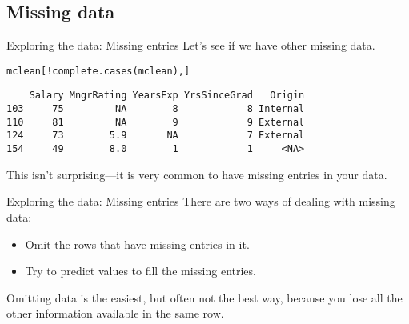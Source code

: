 \documentclass{beamer}\usepackage[]{graphicx}\usepackage[]{color}
\makeatletter
\newcommand{\hlopt}[1]{\textcolor[rgb]{1,0.894,0.769}{#1}}%
\newcommand{\hlstd}[1]{\textcolor[rgb]{1,0.894,0.769}{#1}}%
\newcommand{\hlkwb}[1]{\textcolor[rgb]{0.804,0.776,0.451}{#1}}%
\newcommand{\hlkwc}[1]{\textcolor[rgb]{0.78,0.941,0.545}{#1}}%
\newcommand{\hlkwd}[1]{\textcolor[rgb]{1,0.78,0.769}{#1}}%
\newenvironment{kframe}{%
 \def\at@end@of@kframe{}%
 \ifinner\ifhmode%
  \def\at@end@of@kframe{\end{minipage}}%
  \begin{minipage}{\columnwidth}%
 \fi\fi%
 \def\FrameCommand##1{\hskip\@totalleftmargin \hskip-\fboxsep
 \colorbox{shadecolor}{##1}\hskip-\fboxsep
     \hskip-\linewidth \hskip-\@totalleftmargin \hskip\columnwidth}%
 \MakeFramed {\advance\hsize-\width
   \@totalleftmargin\z@ \linewidth\hsize
   \@setminipage}}%
 {\par\unskip\endMakeFramed%
 \at@end@of@kframe}
\newenvironment{knitrout}{}{} %
\makeatother
\begin{document}
\begin{darkframes}
    \section{Missing data}

    \begin{frame}[fragile]{Exploring the data: Missing entries}
      Let's see if we have other missing data. \pause
\begin{knitrout}
\begin{kframe}
\begin{alltt}
\hlstd{mclean[}\hlopt{!}\hlkwd{complete.cases}\hlstd{(mclean),]}
\end{alltt}
\begin{verbatim}
    Salary MngrRating YearsExp YrsSinceGrad   Origin
103     75         NA        8            8 Internal
110     81         NA        9            9 External
124     73        5.9       NA            7 External
154     49        8.0        1            1     <NA>
\end{verbatim}
\end{kframe}
\end{knitrout}
      \pause
      This isn't surprising---it is very common to have missing entries in your data.
    \end{frame}

    \begin{frame}[fragile]{Exploring the data: Missing entries}
      There are two ways of dealing with missing data:
      \begin{itemize}
        \item Omit the rows that have missing entries in it.
        \item Try to predict values to fill the missing entries.
      \end{itemize}
      Omitting data is the easiest, but often not the best way, \alert{because you lose all the other information available in the same row}.
    \end{frame}

\end{darkframes}
\end{document}
